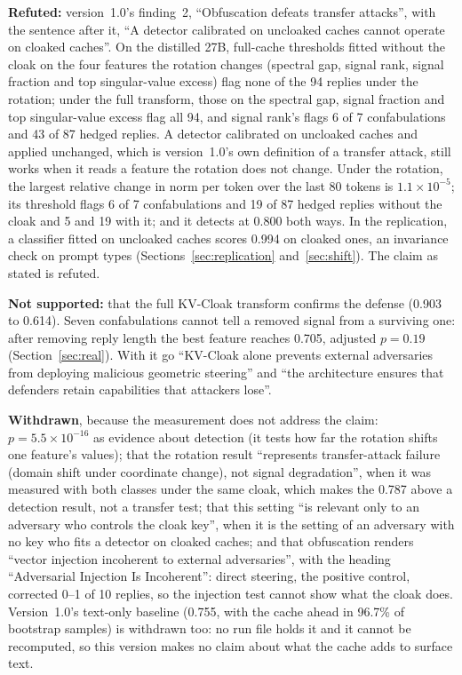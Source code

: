 \documentclass[11pt,a4paper]{article}
\begin{document}
\textbf{Refuted:} version~1.0's finding~2, ``Obfuscation defeats
transfer attacks'', with the sentence after it, ``A detector calibrated
on uncloaked caches cannot operate on cloaked caches''. On the distilled
27B, full-cache thresholds fitted without the cloak on the four features
the rotation changes (spectral gap, signal rank, signal fraction and top
singular-value excess) flag none of the 94 replies under the rotation;
under the full transform, those on the spectral gap, signal fraction and
top singular-value excess flag all 94, and signal rank's flags 6 of 7
confabulations and 43 of 87 hedged replies. A detector calibrated on
uncloaked caches and applied unchanged, which is version~1.0's own
definition of a transfer attack, still works when it reads a feature the
rotation does not change. Under the rotation, the largest relative change
in norm per token over the last 80 tokens is $1.1 \times 10^{-5}$; its
threshold flags 6 of 7 confabulations and 19 of 87 hedged replies
without the cloak and 5 and 19 with it; and it detects at 0.800 both
ways. In the replication, a classifier fitted on uncloaked caches scores
0.994 on cloaked ones, an invariance check on prompt types
(Sections~\ref{sec:replication} and~\ref{sec:shift}). The claim as stated
is refuted.

\textbf{Not supported:} that the full KV-Cloak transform confirms the
defense (0.903 to 0.614). Seven confabulations cannot tell a removed
signal from a surviving one: after removing reply length the best feature
reaches 0.705, adjusted $p = 0.19$ (Section~\ref{sec:real}). With it go
``KV-Cloak alone prevents external adversaries from deploying malicious
geometric steering'' and ``the architecture ensures that defenders retain
capabilities that attackers lose''.

\textbf{Withdrawn}, because the measurement does not address the claim:
$p = 5.5 \times 10^{-16}$ as evidence about detection (it tests how far
the rotation shifts one feature's values); that the
rotation result ``represents transfer-attack failure (domain shift under
coordinate change), not signal degradation'', when it was measured with
both classes under the same cloak, which makes the 0.787 above a
detection result, not a transfer test; that this setting ``is relevant only to
an adversary who controls the cloak key'', when it is the setting of an
adversary with no key who fits a detector on cloaked caches; and that
obfuscation renders ``vector injection incoherent to external
adversaries'', with the heading ``Adversarial Injection Is Incoherent'':
direct steering, the positive control, corrected 0--1 of 10 replies, so
the injection test cannot show what the cloak does. Version~1.0's
text-only baseline (0.755, with the cache ahead in 96.7\% of bootstrap
samples) is withdrawn too: no run file holds it and it cannot be
recomputed, so this version makes no claim about what the cache adds to
surface text.
\end{document}
